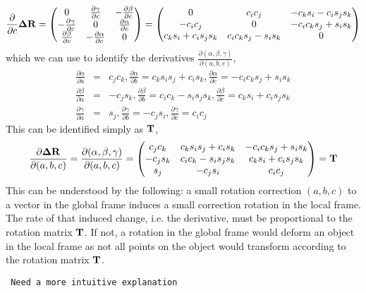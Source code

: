 \documentclass{article}
\def\vec#1{\ensuremath{\mathrm{\bf #1}}}
\def\partder#1#2{\ensuremath{\frac{\partial #1}{\partial #2}}}
\begin{document}
\[
\partder{}{c} \vec{\Delta R} = 
\begin{pmatrix}
 0 & \partder{\gamma}{c} & -\partder{\beta}{c} \\
 -\partder{\gamma}{c} & 0 & \partder{\alpha}{c} \\
 \partder{\beta}{c} & -\partder{\alpha}{c} & 0  
 \end{pmatrix}
=
\begin{pmatrix}
0 &  c_i  c_j  &  -c_k  s_i  - c_i  s_j  s_k  \\ 
-c_i  c_j  &  0 &  -c_i  c_k  s_j  + s_i  s_k  \\
c_k  s_i  +  c_i  s_j  s_k  &  c_i  c_k  s_j  - s_i  s_k  &  0
\end{pmatrix}
\]
which we can use to identify the derivatives $\partder{(\alpha,\beta,\gamma)}{(a,b,c)}$,
\begin{eqnarray}
\partder{\alpha}{a} &=& c_j c_k,
\partder{\alpha}{b} = c_k s_i s_j + c_i s_k,
\partder{\alpha}{c} = -c_i c_k s_j + s_i s_k\\
\partder{\beta}{a} &=& -c_j s_k, 
\partder{\beta}{b} = c_i c_k - s_i s_j s_k,
\partder{\beta}{c} = c_k  s_i + c_i s_j s_k \\
\partder{\gamma}{a} &=& s_j,
\partder{\gamma}{b} = -c_j s_i, 
\partder{\gamma}{c} = c_i c_j 
\end{eqnarray}
This can be identified simply as \vec{T},
\[
\partder{\vec{\Delta R}}{(a,b,c)}=
\partder{(\alpha,\beta,\gamma)}{(a,b,c)}=
\begin{pmatrix}
c_j  c_k  &    c_k  s_i  s_j  + c_i  s_k  &  -c_i  c_k  s_j  + s_i  s_k  \\  
   -c_j  s_k  &  c_i  c_k  - s_i  s_j  s_k  &  c_k  s_i  + c_i  s_j  s_k  \\
  s_j  &  -c_j  s_i  &    c_i  c_j 
\end{pmatrix}
=\vec{T} 
\]
This can be understood by the following: 
a small rotation correction $(a,b,c)$ to a vector in the global frame induces a 
small correction rotation in the local frame. The rate of that induced change, 
i.e. the derivative, must be proportional to the rotation matrix \vec{T}. If not, 
a rotation in the global frame would deform an object in the local frame as 
not all points on the object would transform according to the rotation matrix 
\vec{T}. 

\begin{verbatim} Need a more intuitive explanation \end{verbatim}
\end{document}
